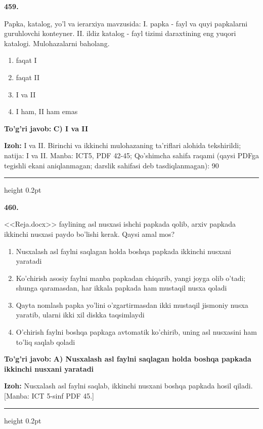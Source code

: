 \documentclass[10pt,a4paper]{article}
\begin{document}
{\bfseries\sffamily\color{ink} 459.}
\par
Papka, katalog, yo'l va ierarxiya mavzusida: I. papka - fayl va quyi papkalarni guruhlovchi konteyner. II. ildiz katalog - fayl tizimi daraxtining eng yuqori katalogi. Mulohazalarni baholang.
\begin{enumerate}[label=\Alph*),leftmargin=9mm]
\item faqat I
\item faqat II
\item I va II
\item I ham, II ham emas
\end{enumerate}
\begin{tcolorbox}[enhanced,breakable,colback=teal!4,colframe=teal!60!black,boxrule=0.45pt,arc=1.2mm,left=2.7mm,right=2.7mm,top=1.8mm,bottom=1.8mm,before skip=2mm,after skip=2mm]
{\bfseries\sffamily\color{teal}To'g'ri javob:} \textbf{C) I va II}
\par\smallskip
{\bfseries Izoh:} I va II. Birinchi va ikkinchi mulohazaning ta'riflari alohida tekshirildi; natija: I va II. Manba: ICT5, PDF 42-45; Qo'shimcha sahifa raqami (qaysi PDFga tegishli ekani aniqlanmagan; darslik sahifasi deb tasdiqlanmagan): 90
\end{tcolorbox}
\vspace{2mm}\hrule height 0.2pt\vspace{3mm}

{\bfseries\sffamily\color{ink} 460.}
\par
<<Reja.docx>> faylining asl nusxasi ishchi papkada qolib, arxiv papkada ikkinchi nusxasi paydo bo'lishi kerak. Qaysi amal mos?
\begin{enumerate}[label=\Alph*),leftmargin=9mm]
\item Nusxalash asl faylni saqlagan holda boshqa papkada ikkinchi nusxani yaratadi
\item Ko'chirish asosiy faylni manba papkadan chiqarib, yangi joyga olib o'tadi; shunga qaramasdan, har ikkala papkada ham mustaqil nusxa qoladi
\item Qayta nomlash papka yo'lini o'zgartirmasdan ikki mustaqil jismoniy nusxa yaratib, ularni ikki xil diskka taqsimlaydi
\item O'chirish faylni boshqa papkaga avtomatik ko'chirib, uning asl nusxasini ham to'liq saqlab qoladi
\end{enumerate}
\begin{tcolorbox}[enhanced,breakable,colback=teal!4,colframe=teal!60!black,boxrule=0.45pt,arc=1.2mm,left=2.7mm,right=2.7mm,top=1.8mm,bottom=1.8mm,before skip=2mm,after skip=2mm]
{\bfseries\sffamily\color{teal}To'g'ri javob:} \textbf{A) Nusxalash asl faylni saqlagan holda boshqa papkada ikkinchi nusxani yaratadi}
\par\smallskip
{\bfseries Izoh:} Nusxalash asl faylni saqlab, ikkinchi nusxani boshqa papkada hosil qiladi. [Manba: ICT 5-sinf PDF 45.]
\end{tcolorbox}
\vspace{2mm}\hrule height 0.2pt\vspace{3mm}
\end{document}
